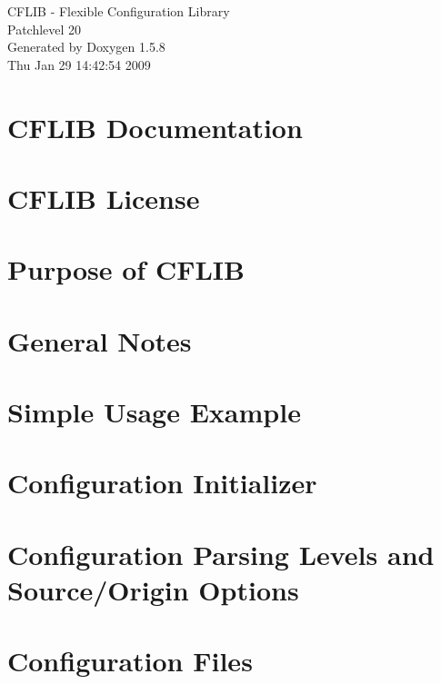 \documentclass[a4paper]{article}
\begin{document}
\begin{titlepage}
\vspace*{7cm}
\begin{center}
{\Large CFLIB - Flexible Configuration Library \\[1ex]\large Patchlevel 20 }\\
\vspace*{1cm}
{\large Generated by Doxygen 1.5.8}\\
\vspace*{0.5cm}
{\small Thu Jan 29 14:42:54 2009}\\
\end{center}
\end{titlepage}
\tableofcontents
{}
\section{CFLIB Documentation}
\label{index}\hypertarget{index}{}
\section{CFLIB License}
\label{license}
\hypertarget{license}{}

\section{Purpose of CFLIB}
\label{purpose}
\hypertarget{purpose}{}

\section{General Notes}
\label{properties}
\hypertarget{properties}{}

\section{Simple Usage Example}
\label{simple_example}
\hypertarget{simple_example}{}

\section{Configuration Initializer}
\label{config_initializer}
\hypertarget{config_initializer}{}

\section{Configuration Parsing Levels and Source/Origin Options}
\label{config_levels}
\hypertarget{config_levels}{}

\section{Configuration Files}
\label{config_files}
\hypertarget{config_files}{}

\end{document}
